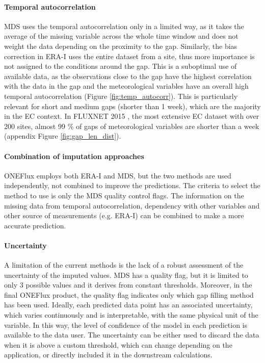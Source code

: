 \documentclass{article}
\begin{document}
\paragraph{Temporal autocorrelation} MDS uses the temporal autocorrelation only in a limited way, as it takes the average of the missing variable across the whole time window and does not weight the data depending on the proximity to the gap.  Similarly, the bias correction in ERA-I uses the entire dataset from a site, thus more importance is not assigned to the conditions around the gap.  This is a suboptimal use of available data, as the observations close to the gap have the highest correlation with the data in the gap and the meteorological variables have an overall high temporal autocorrelation (Figure \ref{fig:temp_autocorr}). This is particularly relevant for short and medium gaps (shorter than 1 week), which are the majority in the EC context.
In FLUXNET 2015 \cite{pastorello_fluxnet2015_2020}, the most extensive EC dataset with over 200 sites, almost 99 \% of gaps of meteorological variables are shorter than a week (appendix Figure \ref{fig:gap_len_dist}).

\paragraph{Combination of imputation approaches} ONEFlux employs both ERA-I and MDS, but the two methods are used independently, not combined to improve the predictions. The criteria to select the method to use is only the MDS quality control flags. The information on the missing data from temporal autocorrelation, dependency with other variables and other source of measurements (e.g. ERA-I) can be combined to make a more accurate prediction.

\paragraph{Uncertainty} A limitation of the current methods is the lack of a robust assessment of the uncertainty of the imputed values. MDS has a quality flag, but it is limited to only 3 possible values and it derives from constant thresholds. Moreover, in the final ONEFlux product, the quality flag indicates only which gap filling method has been used. Ideally, each predicted data point has an associated uncertainty, which varies continuously and is interpretable, with the same physical unit of the variable.  In this way, the level of confidence of the model in each prediction is available to the data user. The uncertainty can be either used to discard the data when it is above a custom threshold, which can change depending on the application, or directly included it in the downstream calculations.
\end{document}
